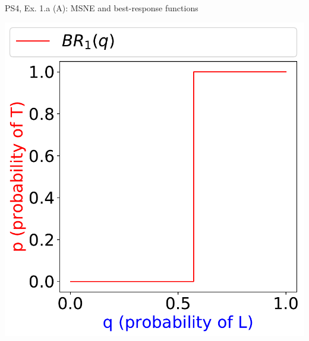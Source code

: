 \begin{frame}{PS4, Ex. 1.a (A): MSNE and best-response functions}
\begin{multicols}{2}
    \includegraphics[width=\columnwidth]{figures/1a_}
  \vfill\null
  \end{multicols}
\end{frame}
